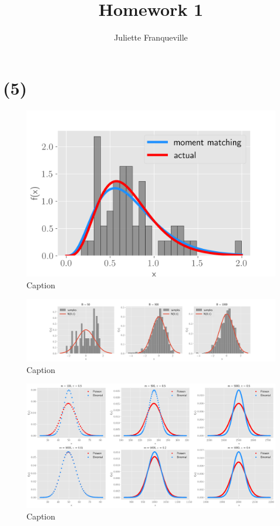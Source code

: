\documentclass[10pt]{article}
\begin{document}
 
\title{Homework 1}
\author{Juliette Franqueville\\
}
\maketitle
 
\section*{(5)}

\begin{figure}[!h]
    \centering
    \includegraphics[scale=.7]{homework_1/first_hist.png}
    \caption{Caption}
    \label{fig:my_label}
\end{figure}

\begin{figure}[!h]
    \centering
    \includegraphics[scale=.35]{homework_1/second_hist.png}
    \caption{Caption}
    \label{fig:my_label}
\end{figure}


\begin{figure}[!h]
    \centering
    \includegraphics[scale=.35]{homework_1/third_hist.png}
    \caption{Caption}
    \label{fig:my_label}
\end{figure}
\end{document}

